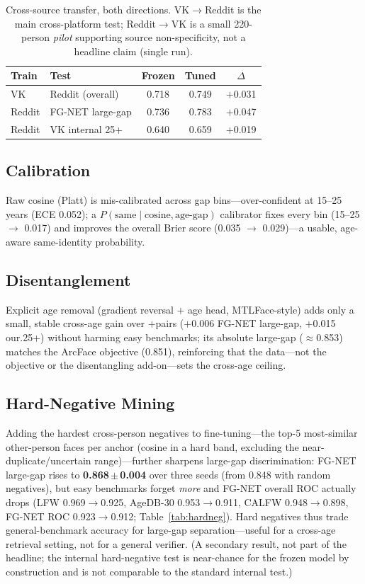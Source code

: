\documentclass[journal]{IEEEtran}
\begin{document}
\begin{table}[!t]
\renewcommand{\arraystretch}{1.2}
\caption{Cross-source transfer, both directions. VK$\to$Reddit is the main cross-platform test; Reddit$\to$VK is a small 220-person \emph{pilot} supporting source non-specificity, not a headline claim (single run).}
\label{tab:crosssource}
\centering
\footnotesize
\begin{tabular}{@{}llccc@{}}
\toprule
Train & Test & Frozen & Tuned & $\Delta$ \\
\midrule
VK & Reddit (overall) & 0.718 & 0.749 & $+$0.031 \\
Reddit & FG-NET large-gap & 0.736 & 0.783 & $+$0.047 \\
Reddit & VK internal 25+ & 0.640 & 0.659 & $+$0.019 \\
\bottomrule
\end{tabular}
\end{table}

\subsection{Calibration}\label{sec:res-calib}
Raw cosine (Platt) is mis-calibrated across gap bins---over-confident at 15--25 years (ECE 0.052); a $P(\text{same}\mid\text{cosine},\text{age-gap})$ calibrator fixes every bin (15--25 $\rightarrow$ 0.017) and improves the overall Brier score (0.035 $\rightarrow$ 0.029)---a usable, age-aware same-identity probability.

\subsection{Disentanglement}\label{sec:res-disentangle}
Explicit age removal (gradient reversal $+$ age head, MTLFace-style) adds only a small, stable cross-age gain over $+$pairs ($+$0.006 FG-NET large-gap, $+$0.015 our.25+) without harming easy benchmarks; its absolute large-gap ($\approx$0.853) matches the ArcFace objective (0.851), reinforcing that the data---not the objective or the disentangling add-on---sets the cross-age ceiling.

\subsection{Hard-Negative Mining}\label{sec:res-hardneg}
Adding the hardest cross-person negatives to fine-tuning---the top-5 most-similar other-person faces per anchor (cosine in a hard band, excluding the near-duplicate/uncertain range)---further sharpens large-gap discrimination: FG-NET large-gap rises to \textbf{0.868\,$\pm$\,0.004} over three seeds (from 0.848 with random negatives), but easy benchmarks forget \emph{more} and FG-NET overall ROC actually drops (LFW 0.969$\to$0.925, AgeDB-30 0.953$\to$0.911, CALFW 0.948$\to$0.898, FG-NET ROC 0.923$\to$0.912; Table~\ref{tab:hardneg}). Hard negatives thus trade general-benchmark accuracy for large-gap separation---useful for a cross-age retrieval setting, not for a general verifier. (A secondary result, not part of the headline; the internal hard-negative test is near-chance for the frozen model by construction and is not comparable to the standard internal test.)
\end{document}
